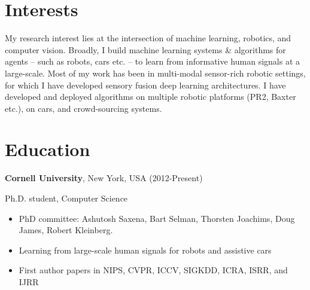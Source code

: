 \documentclass[line,margin]{res}
\begin{document}
 

\address{350 Gates Hall, Cornell University, NY 14850}
\address{ashesh@cs.cornell.edu, \url{www.cs.cornell.edu/~ashesh}}



\begin{resume} 
 

\section{Interests}
My research interest lies at the intersection of machine learning, robotics, and computer vision. Broadly, I build machine learning systems \& algorithms for agents -- such as robots, cars etc. -- to learn from informative human signals at a large-scale. Most of my work has been in multi-modal sensor-rich robotic settings, for which I have developed sensory fusion deep learning architectures. I have developed and deployed algorithms on multiple robotic platforms (PR2, Baxter etc.), on cars, and crowd-sourcing systems.

 
\iffalse

for humans to help machines -- such as robots, cars etc. -- become smart by implicitly providing
learning signals. I am particularly interested in learning from signals that are easy to
elicit at large-scale but are inherently weak and noisy. I am recently
exploiting the potential of crowd-sourcing feedback to teach robots good trajectories in
context-rich environments and using vision based human feedback for
assistive cars. 
\fi
\section{Education} 
 
{\bf Cornell University}, New York, USA  \hfill (2012-Present)
 
 \vspace{-4mm}
  \hspace {4mm } Ph.D. student, Computer Science 
 \begin{itemize} \itemsep -2pt  %
 \item PhD committee: Ashutosh Saxena, Bart Selman, Thorsten Joachims, Doug James,
Robert Kleinberg.
 \item Learning from large-scale human signals for robots and assistive cars
  \item First author papers in NIPS, CVPR, ICCV, SIGKDD, ICRA, ISRR, and IJRR
 \end{itemize}
 


\end{resume}
\end{document}
